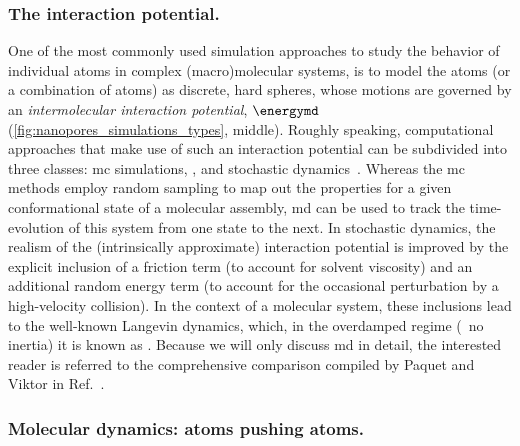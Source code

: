 \subsubsection{The interaction potential.}
%

One of the most commonly used simulation approaches to study the behavior of individual atoms in complex
(macro)molecular systems, is to model the atoms (or a combination of atoms) as discrete, hard spheres, whose
motions are governed by an \emph{intermolecular interaction potential}, $\energymd$
(\cref{fig:nanopores_simulations_types}, middle). Roughly speaking, computational approaches that make use of
such an interaction potential can be subdivided into three classes: \gls{mc} simulations, ,
and stochastic dynamics~\cite{Paquet-2015}. Whereas the \gls{mc} methods employ random sampling to map out the
properties for a given conformational state of a molecular assembly, \gls{md} can be used to track the
time-evolution of this system from one state to the next. In stochastic dynamics, the realism of the
(intrinsically approximate) interaction potential is improved by the explicit inclusion of a friction
term (to account for solvent viscosity) and an additional random energy term (to account for the occasional
perturbation by a high-velocity collision). In the context of a molecular system, these inclusions lead to the
well-known Langevin dynamics, which, in the overdamped regime (\ie~no inertia) it is known as .
Because we will only discuss \gls{md} in detail, the interested reader is referred to the comprehensive
comparison compiled by Paquet and Viktor in Ref.~\cite{Paquet-2015}.

\subsubsection{Molecular dynamics: atoms pushing atoms.}
%

